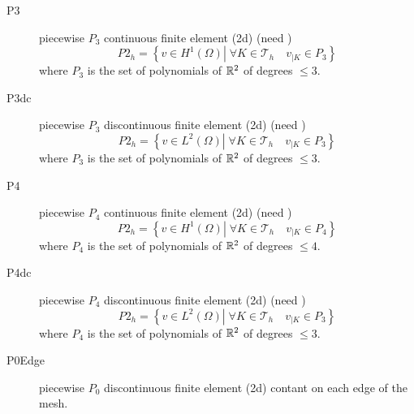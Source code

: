 \documentclass[a4paper,twoside,12pt]{book}
\begin{document}
\begin{description}
      \item[P3] piecewise $P_{3}$  continuous finite element (2d)  (need )
     \begin{equation}
     P2_{h} = \left\{ v \in H^{1}(\Omega) \left|\; \forall K \in \mathcal{T}_{h}
        \quad v_{|K} \in P_{3} \right.\right\}
     \end{equation}
     where
     $P_{3}$ is the set of polynomials of $\mathbb{R}^{2}$ of  degrees $\le 3$.
     
      \item[P3dc] piecewise $P_{3}$  discontinuous finite element (2d)  (need )
     \begin{equation}
     P2_{h} = \left\{ v \in L^2(\Omega) \left|\; \forall K \in \mathcal{T}_{h}
        \quad v_{|K} \in P_{3} \right.\right\}
     \end{equation}
     where
     $P_{3}$ is the set of polynomials of $\mathbb{R}^{2}$ of  degrees $\le 3$.

      \item[P4] piecewise $P_{4}$  continuous finite element (2d)  (need )
     \begin{equation}
     P2_{h} = \left\{ v \in H^{1}(\Omega) \left|\; \forall K \in \mathcal{T}_{h}
        \quad v_{|K} \in P_{4} \right.\right\}
     \end{equation}
     where
     $P_{4}$ is the set of polynomials of $\mathbb{R}^{2}$ of  degrees $\le 4$.
     
      \item[P4dc] piecewise $P_{4}$  discontinuous finite element (2d)  (need )
     \begin{equation}
     P2_{h} = \left\{ v \in L^2(\Omega) \left|\; \forall K \in \mathcal{T}_{h}
        \quad v_{|K} \in P_{3} \right.\right\}
     \end{equation}
     where
     $P_{4}$ is the set of polynomials of $\mathbb{R}^{2}$ of  degrees $\le 3$.

     \item[P0Edge] piecewise $P_{0}$  discontinuous finite element (2d)  contant on each edge  of the mesh.


\end{description}
\end{document}
